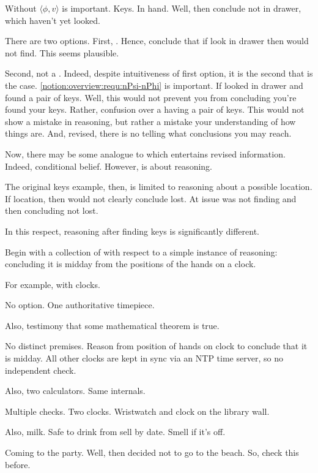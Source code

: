 \begin{note}
  Without \(\langle \phi,v \rangle\) is important.
  Keys.
  In hand.
  Well, then conclude not in drawer, which haven't yet looked.

  There are two options.
  First, \requ{}.
  Hence, conclude that if look in drawer then would not find.
  This seems plausible.

  Second, not a \requ{}.
  Indeed, despite intuitiveness of first option, it is the second that is the case.
  \autoref{notion:overview:requ:nPsi-nPhi} is important.
  If looked in drawer and found a pair of keys.
  Well, this would not prevent you from concluding you're found your keys.
  Rather, confusion over a having a pair of keys.
  This would not show a mistake in reasoning, but rather a mistake your understanding of how things are.
  And, revised, there is no telling what conclusions you may reach.

  Now, there may be some analogue to \csN{} which entertains revised information.
  Indeed, conditional belief.
  However, \csN{} is about reasoning.

  The original keys example, then, is limited to reasoning about a possible location.
  If location, then would not clearly conclude lost.
  At issue was not finding and then concluding not lost.

  In this respect, reasoning after finding keys is significantly different.
\end{note}

\begin{note}[\illu{3}]
  Begin with a collection of  with respect to a simple instance of reasoning: concluding it is midday from the positions of the hands on a clock.


  For example, with clocks.

  No option.
  One authoritative timepiece.

  Also, testimony that some mathematical theorem is true.

  No distinct premises.
  Reason from position of hands on clock to conclude that it is midday.
  All other clocks are kept in sync via an NTP time server, so no independent check.

  Also, two calculators.
  Same internals.

  Multiple checks.
  Two clocks.
  Wristwatch and clock on the library wall.

  Also, milk.
  Safe to drink from sell by date.
  Smell if it's off.

  Coming to the party.
  Well, then decided not to go to the beach.
  So, check this before.
\end{note}

